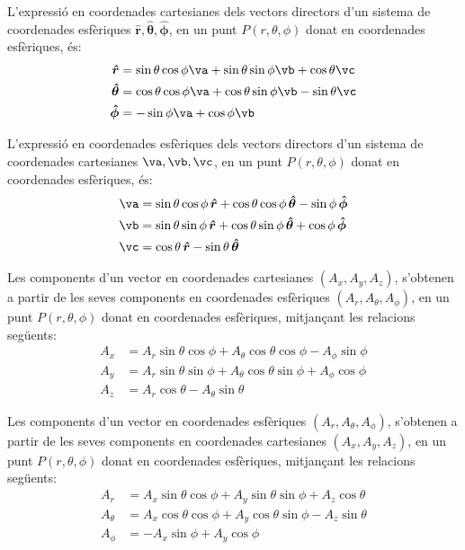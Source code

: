 \documentclass[catalan,a4paper,twoside,11pt]{article}
\begin{document}
L'expressió en coordenades cartesianes dels vectors directors d'un sistema de coordenades  esfèriques $\boldsymbol{\hat{r}},\boldsymbol{\hat{\theta}},\boldsymbol{\hat{\phi}}$, en un punt $P(r,\theta,\phi)$ donat en coordenades esfèriques, és:
\begin{subequations}\begin{align}
    \boldsymbol{\hat{r}} &=\sin\theta\cos\phi\va+ \sin\theta\sin\phi\vb+\cos\theta\vc\\
    \boldsymbol{\hat{\theta}} &=\cos\theta\cos\phi\va+
    \cos\theta\sin\phi\vb-\sin\theta\vc\\
    \boldsymbol{\hat{\phi}}&=-\sin\phi\va+\cos\phi\vb
\end{align}\end{subequations}

L'expressió en coordenades esfèriques dels vectors directors d'un sistema de coordenades  cartesianes $\va,\vb,\vc$, en un punt $P(r,\theta,\phi)$ donat en coordenades esfèriques, és:
\begin{subequations}\begin{align}
    \va &=\sin\theta\cos\phi\,\boldsymbol{\hat{r}}+
    \cos\theta\cos\phi\,\boldsymbol{\hat{\theta}}-\sin\phi\,\boldsymbol{\hat{\phi}}\\
    \vb &=\sin\theta\sin\phi\,\boldsymbol{\hat{r}}+
    \cos\theta\sin\phi\,\boldsymbol{\hat{\theta}}+\cos\phi\,\boldsymbol{\hat{\phi}}\\
    \vc &=\cos\theta\,\boldsymbol{\hat{r}}-\sin\theta\,\boldsymbol{\hat{\theta}}
\end{align}\end{subequations}

Les components d'un vector en coordenades cartesianes $(A_x, A_y, A_z)$, s'obtenen a partir de les seves components en coordenades esfèriques $(A_r, A_\theta, A_\phi)$, en un punt $P(r,\theta,\phi)$ donat en coordenades esfèriques, mitjançant les relacions següents:
\begin{subequations}\begin{align}
    A_x &= A_r\sin\theta\cos\phi+A_\theta\cos\theta\cos\phi-A_\phi\sin\phi \\
    A_y &= A_r\sin\theta\sin\phi+A_\theta\cos\theta\sin\phi+A_\phi\cos\phi\\
    A_z &= A_r\cos\theta-A_\theta\sin\theta
\end{align}\end{subequations}

Les components d'un vector en coordenades esfèriques $(A_r, A_\theta, A_\phi)$, s'obtenen a partir de les seves components en coordenades cartesianes $(A_x, A_y, A_z)$, en un punt $P(r,\theta,\phi)$ donat en coordenades esfèriques, mitjançant les relacions següents:
\begin{subequations}\begin{align}
    A_r &=  A_x\sin\theta\cos\phi+A_y\sin\theta\sin\phi+A_z\cos\theta\\
    A_\theta &=  A_x\cos\theta\cos\phi+A_y\cos\theta\sin\phi-A_z\sin\theta\\
    A_\phi &= -A_x\sin\phi+A_y\cos\phi
\end{align}\end{subequations}
\end{document}
